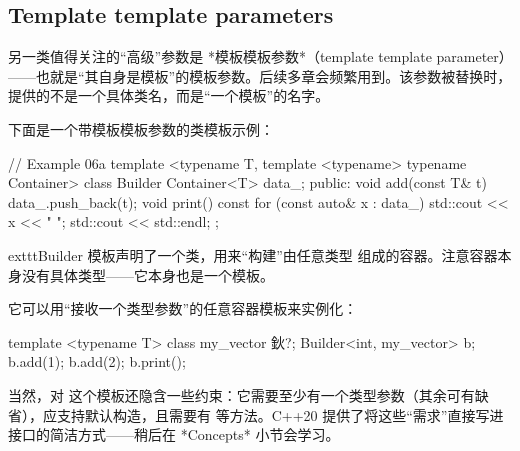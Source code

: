 \subsection{Template template parameters}
另一类值得关注的“高级”参数是 *模板模板参数*（template template parameter）——也就是“其自身是模板”的模板参数。后续多章会频繁用到。该参数被替换时，提供的不是一个具体类名，而是“一个模板”的名字。

下面是一个带模板模板参数的类模板示例：

\begin{code}
// Example 06a
template <typename T,
         template <typename> typename Container>
class Builder {
  Container<T> data_;
  public:
  void add(const T& t) { data_.push_back(t); }
  void print() const {
    for (const auto& x : data_) std::cout << x << " ";
    std::cout << std::endl;
  }
};
\end{code}

	exttt{Builder} 模板声明了一个类，用来“构建”由任意类型  组成的容器。注意容器本身没有具体类型——它本身也是一个模板。

它可以用“接收一个类型参数”的任意容器模板来实例化：

\begin{code}
template <typename T> class my_vector { 鈥?};
Builder<int, my_vector> b;
b.add(1);
b.add(2);
b.print();
\end{code}

当然，对  这个模板还隐含一些约束：它需要至少有一个类型参数（其余可有缺省），应支持默认构造，且需要有  等方法。C++20 提供了将这些“需求”直接写进接口的简洁方式——稍后在 *Concepts* 小节会学习。

